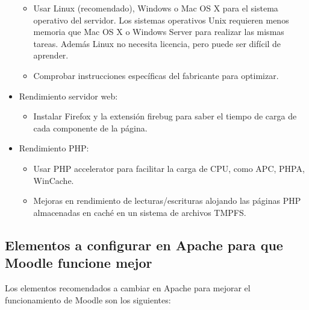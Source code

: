 \begin{itemize}
\begin{itemize}
			\item Usar Linux (recomendado), Windows o Mac OS X para el sistema operativo del servidor. Los sistemas operativos Unix requieren menos memoria que Mac OS X o Windows Server para realizar las mismas tareas. Además Linux no necesita licencia, pero puede ser difícil de aprender.
			\item Comprobar instrucciones específicas del fabricante para optimizar.
		\end{itemize}
		\item Rendimiento servidor web:
		\begin{itemize}
			\item Instalar Firefox y la extensión firebug para saber el tiempo de carga de cada componente de la página.
		\end{itemize}
		\item Rendimiento PHP:
		\begin{itemize}
			\item Usar PHP accelerator para facilitar la carga de CPU, como APC, PHPA, WinCache.
			\item Mejoras en rendimiento de lecturas/escrituras alojando las páginas PHP almacenadas en caché en un sistema de archivos TMPFS.
		\end{itemize}
	\end{itemize}
	
	\subsection{Elementos a configurar en Apache para que Moodle funcione mejor}
	
	Los elementos recomendados a cambiar en Apache para mejorar el funcionamiento de Moodle son los siguientes:
	
